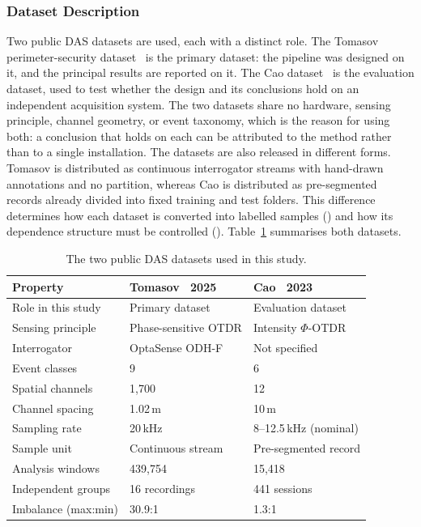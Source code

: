 \subsubsection{Dataset Description}
\label{sec:chap3Dataset}
Two public DAS datasets are used, each with a distinct role. The Tomasov perimeter-security dataset~\cite{tomasov2025dataset} is the primary dataset: the pipeline was designed on it, and the principal results are reported on it. The Cao dataset~\cite{caoxin2023opendataset} is the evaluation dataset, used to test whether the design and its conclusions hold on an independent acquisition system. The two datasets share no hardware, sensing principle, channel geometry, or event taxonomy, which is the reason for using both: a conclusion that holds on each can be attributed to the method rather than to a single installation. The datasets are also released in different forms. Tomasov is distributed as continuous interrogator streams with hand-drawn annotations and no partition, whereas Cao is distributed as pre-segmented records already divided into fixed training and test folders. This difference determines how each dataset is converted into labelled samples () and how its dependence structure must be controlled (). Table~\ref{tab:dataset_comparison} summarises both datasets.

\begin{table}[!htbp]
	\centering
	\caption{The two public DAS datasets used in this study.}
	\label{tab:dataset_comparison}
	\small
	\begin{tabular}{@{}lll@{}}
		\toprule
		\textbf{Property} & \textbf{Tomasov \etal\ 2025} & \textbf{Cao \etal\ 2023}\\
		\midrule
		Role in this study  & Primary dataset            & Evaluation dataset \\
		Sensing principle   & Phase-sensitive OTDR       & Intensity $\Phi$-OTDR \\
		Interrogator        & OptaSense ODH-F            & Not specified \\
		Event classes       & 9                          & 6 \\
		Spatial channels    & 1{,}700                    & 12 \\
		Channel spacing     & 1.02\,m                    & 10\,m \\
		Sampling rate       & 20\,kHz                    & 8--12.5\,kHz (nominal) \\
		Sample unit         & Continuous stream          & Pre-segmented record \\
		Analysis windows    & 439{,}754                  & 15{,}418 \\
		Independent groups  & 16 recordings              & 441 sessions \\
		Imbalance (max:min) & 30.9:1                     & 1.3:1 \\
		\bottomrule
	\end{tabular}
\end{table}

